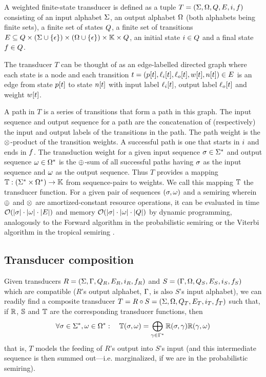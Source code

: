 \documentclass{article}
\begin{document}
A weighted finite-state transducer is defined as a tuple
$T = (\Sigma,\Omega,Q,E,i,f)$
consisting of an input alphabet $\Sigma$,
an output alphabet $\Omega$ (both alphabets being finite sets),
a finite set of states $Q$,
a finite set of transitions
$E \subseteq Q \times (\Sigma \cup \{ \epsilon \}) \times (\Omega \cup \{ \epsilon \}) \times \mathbb{K} \times Q$,
an initial state $i \in Q$
and a final state $f \in Q$.

The transducer $T$ can be thought of as an edge-labelled directed graph
where each state is a node
and each transition
$t = (p[t],\ell_i[t],\ell_o[t],w[t],n[t]) \in E$
is an edge from state $p[t]$ to state $n[t]$
with input label $\ell_i[t]$,
output label $\ell_o[t]$
and weight $w[t]$.

A path in $T$ is a series of transitions that form a path in this graph.
The input sequence and output sequence for a path are the concatenation of (respectively)
the input and output labels of the transitions in the path.
The path weight is the $\otimes$-product of the transition weights.
A successful path is one that starts in $i$ and ends in $f$.
The transduction weight for a given input sequence $\sigma \in {\Sigma}^{\ast}$
and output sequence $\omega \in {\Omega}^{\ast}$
is the $\oplus$-sum of all successful paths
having $\sigma$ as the input sequence
and $\omega$ as the output sequence.
Thus $T$ provides a mapping
$\mathbb{T}:({\Sigma}^{\ast} \times {\Omega}^{\ast}) \to \mathbb{K}$
from sequence-pairs to weights.
We call this mapping $\mathbb{T}$ the transducer function.
For a given pair of sequences $(\sigma,\omega)$
and a semiring wherein $\oplus$ and $\otimes$ are amortized-constant resource operations,
it can be evaluated in time ${\cal O}(|\sigma| \cdot |\omega| \cdot |E|)$
and memory ${\cal O}(|\sigma| \cdot |\omega| \cdot |Q|)$
by dynamic programming,
analogously to the Forward algorithm in the probabilistic semiring
or the Viterbi algorithm in the tropical semiring
\cite{Durbin98}.

\subsection*{Transducer composition}

Given transducers
 $R = (\Sigma, \Gamma, Q_R, E_R, i_R, f_R)$ and
 $S = (\Gamma, \Omega, Q_S, E_S, i_S, f_S)$
which are compatible ($R$'s output alphabet, $\Gamma$, is also $S$'s input alphabet),
we can readily find a composite transducer
 $T = R \circ S = (\Sigma, \Omega, Q_T, E_T, i_T, f_T)$
such that, if $\mathbb{R}$, $\mathbb{S}$ and $\mathbb{T}$ are the corresponding transducer functions,
then
\[
\forall \sigma \in {\Sigma}^{\ast}, \omega \in {\Omega}^{\ast}:
\quad
\mathbb{T}(\sigma,\omega) = \bigoplus_{\gamma \in {\Gamma}^{\ast}} \mathbb{R}(\sigma,\gamma) \mathbb{R}(\gamma,\omega)
\]
that is, $T$ models the feeding of $R$'s output into $S$'s input
(and this intermediate sequence is then summed out---i.e. marginalized, if we are in the probabilistic semiring).
\end{document}
